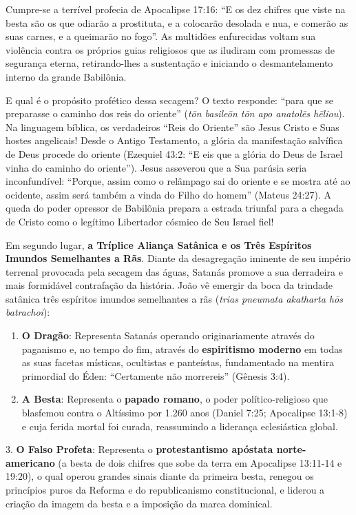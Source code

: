 \documentclass[11pt,a4paper,openany]{book}
\begin{document}
Cumpre-se a terrível profecia de Apocalipse 17:16:
``E os dez chifres que viste na besta são os que odiarão a prostituta, e a colocarão desolada e nua, e comerão as suas carnes, e a queimarão no fogo''.
As multidões enfurecidas voltam sua violência contra os próprios guias religiosos que as iludiram com promessas de segurança eterna, retirando-lhes a sustentação e iniciando o desmantelamento interno da grande Babilônia.

E qual é o propósito profético dessa secagem? O texto responde: ``para que se preparasse o caminho dos reis do oriente'' (\textit{tōn basileōn tōn apo anatolēs hēliou}).
Na linguagem bíblica, os verdadeiros ``Reis do Oriente'' são Jesus Cristo e Suas hostes angelicais! Desde o Antigo Testamento, a glória da manifestação salvífica de Deus procede do oriente (Ezequiel 43:2: ``E eis que a glória do Deus de Israel vinha do caminho do oriente''). Jesus asseverou que a Sua parúsia seria inconfundível: ``Porque, assim como o relâmpago sai do oriente e se mostra até ao ocidente, assim será também a vinda do Filho do homem'' (Mateus 24:27). A queda do poder opressor de Babilônia prepara a estrada triunfal para a chegada de Cristo como o legítimo Libertador cósmico de Seu Israel fiel!

Em segundo lugar, \textbf{a Tríplice Aliança Satânica e os Três Espíritos Imundos Semelhantes a Rãs}.
Diante da desagregação iminente de seu império terrenal provocada pela secagem das águas, Satanás promove a sua derradeira e mais formidável contrafação da história. João vê emergir da boca da trindade satânica três espíritos imundos semelhantes a rãs (\textit{trias pneumata akatharta hōs batrachoi}):
\begin{enumerate}
  \item \textbf{O Dragão}: Representa Satanás operando originariamente através do paganismo e, no tempo do fim, através do \textbf{espiritismo moderno} em todas as suas facetas místicas, ocultistas e panteístas, fundamentado na mentira primordial do Éden: ``Certamente não morrereis'' (Gênesis 3:4).
  \item \textbf{A Besta}: Representa o \textbf{papado romano}, o poder político-religioso que blasfemou contra o Altíssimo por 1.260 anos (Daniel 7:25; Apocalipse 13:1-8) e cuja ferida mortal foi curada, reassumindo a liderança eclesiástica global.
\end{enumerate}

3. \textbf{O Falso Profeta}: Representa o \textbf{protestantismo apóstata norte-americano} (a besta de dois chifres que sobe da terra em Apocalipse 13:11-14 e 19:20), o qual operou grandes sinais diante da primeira besta, renegou os princípios puros da Reforma e do republicanismo constitucional, e liderou a criação da imagem da besta e a imposição da marca dominical.
\end{document}
